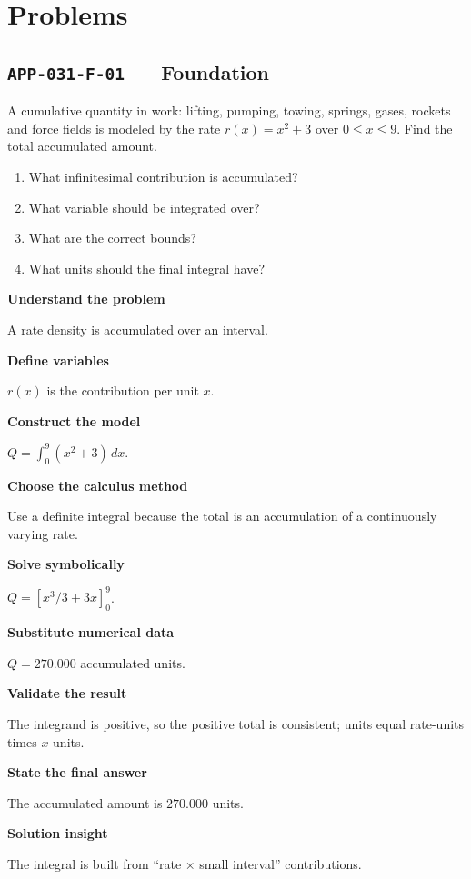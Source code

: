 \documentclass[11pt]{book}
\newcommand{\pid}[1]{\texttt{#1}}
\begin{document}
\section*{Problems}
\subsection*{\pid{APP-031-F-01} — Foundation}
\begin{problembox}
A cumulative quantity in work: lifting, pumping, towing, springs, gases, rockets and force fields is modeled by the rate $r(x)=x^2+3$ over $0\le x\le 9$. Find the total accumulated amount.
\end{problembox}
\begin{promptbox}\begin{enumerate}
\item What infinitesimal contribution is accumulated?
\item What variable should be integrated over?
\item What are the correct bounds?
\item What units should the final integral have?
\end{enumerate}\end{promptbox}
\begin{solutionbox}
\textbf{Understand the problem}\par A rate density is accumulated over an interval.\par\medskip
\textbf{Define variables}\par $r(x)$ is the contribution per unit $x$.\par\medskip
\textbf{Construct the model}\par $Q=\int_0^{9}(x^2+3)\,dx$.\par\medskip
\textbf{Choose the calculus method}\par Use a definite integral because the total is an accumulation of a continuously varying rate.\par\medskip
\textbf{Solve symbolically}\par $Q=[x^3/3+3x]_0^{9}$.\par\medskip
\textbf{Substitute numerical data}\par $Q=270.000$ accumulated units.\par\medskip
\textbf{Validate the result}\par The integrand is positive, so the positive total is consistent; units equal rate-units times $x$-units.\par\medskip
\textbf{State the final answer}\par The accumulated amount is $270.000$ units.\par\medskip
\textbf{Solution insight}\par The integral is built from “rate × small interval” contributions.\par\medskip
\end{solutionbox}
\end{document}
